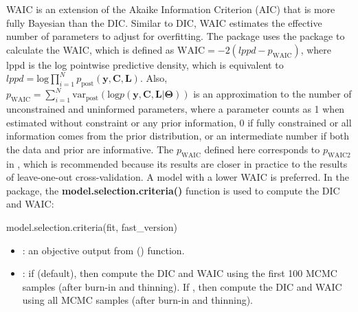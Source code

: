 WAIC is an extension of the Akaike Information Criterion (AIC) that is more fully Bayesian than the DIC. Similar to DIC, WAIC estimates the effective number of parameters to adjust for overfitting. The  package uses the  package \citep{Hall2022} to calculate the WAIC, which is defined as $ \text{WAIC} = -2(lppd - p_{\text{WAIC}}) $, where lppd is the log pointwise predictive density, which is equivalent to $lppd=\text{log}\prod_{i=1}^Np_{\text{post}}(\boldsymbol{y},\boldsymbol{C},\boldsymbol{L})$. Also, $p_{\text{WAIC}} = \sum_{i=1}^N \text{var}_{\text{post}} (\text{log}p(\boldsymbol{y},\boldsymbol{C},\boldsymbol{L}|\boldsymbol{\Theta})) $ is an approximation to the number of unconstrained and uninformed parameters, where a parameter counts as 1 when estimated without constraint or any prior information, 0 if fully constrained or all information comes from the prior distribution, or an intermediate number if both the data and prior are informative. The $p_{\text{WAIC}}$ defined here corresponds to $p_{\text{WAIC2}}$ in \citet{Gelman2014a}, which is recommended because its results are closer in practice to the results of leave-one-out cross-validation. A model with a lower WAIC is preferred.
In the  package, the \textbf{model.selection.criteria()} function is used to compute the DIC and WAIC: 
\begin{example}
model.selection.criteria(fit, fast_version)
\end{example}
\begin{itemize}
	\item {}: an objective output from () function.  
	\item {}: if   (default), then compute the DIC and WAIC using the first 100 MCMC samples (after burn-in and thinning). If  , then compute the DIC and WAIC using all MCMC samples (after burn-in and thinning). 
\end{itemize}
